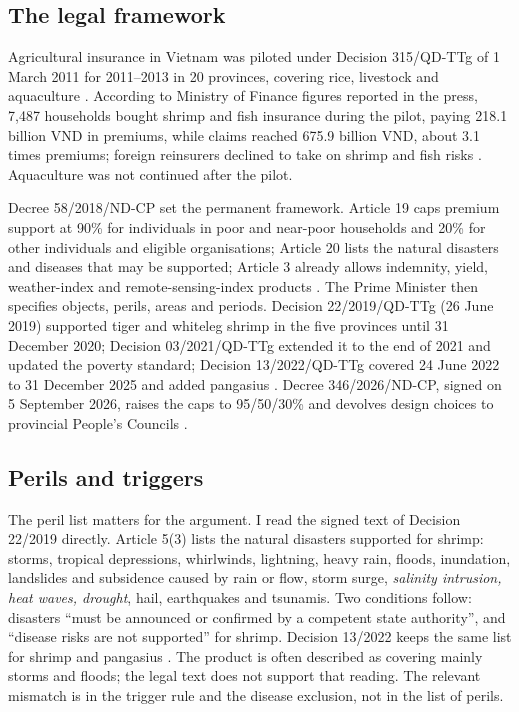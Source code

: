 \documentclass[11pt,a4paper]{article}
\begin{document}
\subsection{The legal framework}

Agricultural insurance in Vietnam was piloted under Decision 315/QD-TTg of 1 March 2011 for 2011--2013 in 20 provinces, covering rice, livestock and aquaculture \parencite{decision315_2011}. According to Ministry of Finance figures reported in the press, 7,487 households bought shrimp and fish insurance during the pilot, paying 218.1 billion VND in premiums, while claims reached 675.9 billion VND, about 3.1 times premiums; foreign reinsurers declined to take on shrimp and fish risks \parencite{tbtc2016bhts}. Aquaculture was not continued after the pilot.

Decree 58/2018/ND-CP set the permanent framework. Article 19 caps premium support at 90\% for individuals in poor and near-poor households and 20\% for other individuals and eligible organisations; Article 20 lists the natural disasters and diseases that may be supported; Article 3 already allows indemnity, yield, weather-index and remote-sensing-index products \parencite{decree58_2018}. The Prime Minister then specifies objects, perils, areas and periods. Decision 22/2019/QD-TTg (26 June 2019) supported tiger and whiteleg shrimp in the five provinces until 31 December 2020; Decision 03/2021/QD-TTg extended it to the end of 2021 and updated the poverty standard; Decision 13/2022/QD-TTg covered 24 June 2022 to 31 December 2025 and added pangasius \parencite{decision22_2019,decision03_2021,decision13_2022,tbtc2022qd13}. Decree 346/2026/ND-CP, signed on 5 September 2026, raises the caps to 95/50/30\% and devolves design choices to provincial People's Councils \parencite{decree346_2026,tckttc2026nd346}.

\subsection{Perils and triggers}

The peril list matters for the argument. I read the signed text of Decision 22/2019 directly. Article 5(3) lists the natural disasters supported for shrimp: storms, tropical depressions, whirlwinds, lightning, heavy rain, floods, inundation, landslides and subsidence caused by rain or flow, storm surge, \emph{salinity intrusion, heat waves, drought}, hail, earthquakes and tsunamis. Two conditions follow: disasters ``must be announced or confirmed by a competent state authority'', and ``disease risks are not supported'' for shrimp. Decision 13/2022 keeps the same list for shrimp and pangasius \parencite{tbtc2022qd13}. The product is often described as covering mainly storms and floods; the legal text does not support that reading. The relevant mismatch is in the trigger rule and the disease exclusion, not in the list of perils.
\end{document}
